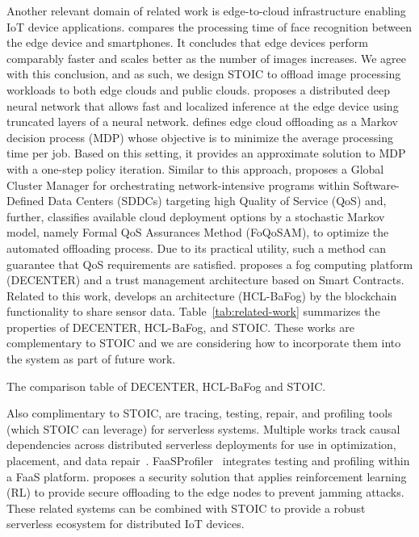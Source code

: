 Another relevant domain of related work is edge-to-cloud 
infrastructure enabling IoT device applications. 
\cite{ref:face} compares the processing time of face recognition 
between the edge device and smartphones.  It concludes that edge
devices perform comparably faster and scales better as the number of images
increases. We agree with this conclusion, and as such, we design STOIC to offload
image processing workloads to both edge clouds and public clouds.
\cite{ref:DDNN} proposes a distributed deep neural network that allows fast and
localized inference at the edge device using truncated layers of a neural
network. \cite{ref:cooperative} defines edge cloud offloading as a Markov
decision process (MDP) whose objective is to minimize the average processing
time per job. Based on this setting, it provides an approximate solution to
MDP with a one-step policy iteration. Similar to this approach,
\cite{ref:QoS-aware} proposes a Global Cluster Manager for orchestrating
network-intensive programs within Software-Defined Data Centers (SDDCs)
targeting high Quality of Service (QoS) and, further, \cite{ref:FQoS} classifies
available cloud deployment options by a stochastic Markov model, namely Formal
QoS Assurances Method (FoQoSAM), to optimize the automated offloading process.
Due to its practical utility, such a method can guarantee that QoS requirements are satisfied. \cite{ref:trust} proposes a fog computing platform (DECENTER) and a trust
management architecture based on Smart Contracts. Related to this work,
\cite{ref:multichain} develops an architecture (HCL-BaFog) by the blockchain
functionality to share sensor data. Table~\ref{tab:related-work} summarizes the
properties of DECENTER, HCL-BaFog, and STOIC. These works are complementary to
STOIC and we are considering how to incorporate them into the system as part of
future work.

\begin{table}
\centering
\resizebox{390pt}{!}{
}
\caption{ The comparison table of DECENTER, HCL-BaFog and STOIC.
\label{tab:related-work}}
\end{table}

Also complimentary to STOIC, are tracing, testing, repair, and profiling tools
(which STOIC can leverage) for serverless systems. Multiple works track causal
dependencies across distributed serverless deployments for use in optimization,
placement, and data
repair~\cite{ref:repairdata,deptracing19,gammaray17,aws-xray}.
FaaSProfiler~\cite{ref:profile} integrates testing and profiling 
within a FaaS platform. \cite{ref:security} proposes a security solution that
applies reinforcement learning (RL) to provide secure offloading to the edge
nodes to prevent jamming attacks. These related systems can be combined with
STOIC to provide a robust serverless ecosystem for distributed IoT devices.

